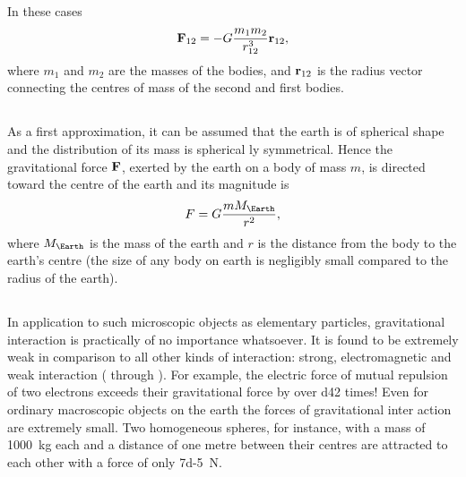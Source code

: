 In these cases
\begin{equation*}%
\vb{F}_{12} = -G \frac{m_{1}m_{2}}{r_{12}^{3}} \vb{r}_{12},
\end{equation*}
where $m_{1}$ and $m_{2}$ are the masses of the bodies, and $\vb{r}_{12}$ is the radius vector connecting the centres of mass  of the second and first bodies.

\subsection{}\label{6.1.3} As a first approximation, it can be assumed that the earth is of spherical shape and the distribution of its mass is spherical­ ly symmetrical. Hence the gravitational force $\vb{F}$, exerted by the earth on a body of mass $m$, is directed toward the centre of the earth and its magnitude is
\begin{equation*}%
F = G \frac{mM_{\Earth}}{r^{2}},
\end{equation*}
where $M_{\Earth}$ is the mass of the earth and $r$ is the distance from the body to the earth's centre (the size of any body on earth is negligibly small compared to the radius of the earth).

\subsection{}\label{6.1.4} In application to such microscopic objects as elementary particles, gravitational interaction is practically of no import­ance whatsoever. It is found to be extremely weak in comparison to all other kinds of interaction: strong, electromagnetic and weak interaction ( through ). For example, the electric force of mutual repulsion of two electrons exceeds their gravitational force by over \num{d42} times! Even for ordinary macro­scopic objects on the earth the forces of gravitational inter­ action are extremely small. Two homogeneous spheres, for instance, with a mass of \SI{1000}{\kilo\gram} each and a distance of one metre between their centres are attracted to each other with a force of only \SI{7d-5}{\newton}.

